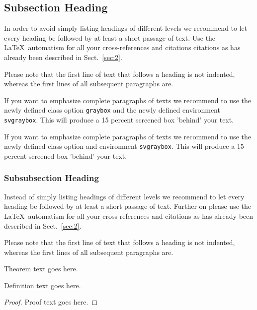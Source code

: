 \subsection{Subsection Heading} %
In order to avoid simply listing headings of different levels we recommend to let every heading be followed by at least a short passage of text. Use the \LaTeX\ automatism for all your cross-references and citations citations as has already been described in Sect.~\ref{sec:2}.

Please note that the first line of text that follows a heading is not indented, whereas the first lines of all subsequent paragraphs are.

\begin{svgraybox}
If you want to emphasize complete paragraphs of texts we recommend to use the newly defined class option \verb|graybox| and the newly defined environment \verb|svgraybox|. This will produce a 15 percent screened box 'behind' your text.

If you want to emphasize complete paragraphs of texts we recommend to use the newly defined class option and environment \verb|svgraybox|. This will produce a 15 percent screened box 'behind' your text.
\end{svgraybox}


\subsubsection{Subsubsection Heading}
Instead of simply listing headings of different levels we recommend to let every heading be followed by at least a short passage of text.  Further on please use the \LaTeX\ automatism for all your cross-references and citations as has already been described in Sect.~\ref{sec:2}.

Please note that the first line of text that follows a heading is not indented, whereas the first lines of all subsequent paragraphs are.


\begin{theorem}
Theorem text goes here.
\end{theorem}
%
%
\begin{definition}
Definition text goes here.
\end{definition}

\begin{proof}
Proof text goes here.
\end{proof}

